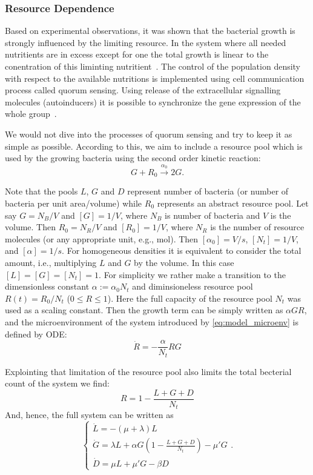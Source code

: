 \documentclass[10pt,A4paper]{article}
\begin{document}
\subsubsection{Resource Dependence}

Based on experimental observations, it was shown that the bacterial growth is strongly influenced by the limiting resource.
In the system where all needed nutritients are in excess except for one the total growth is linear to the conentration of this liminting nutritient~\cite{hibbing_bacterial_2010, monod_growth_1949}.
The control of the population density with respect to the available nutritions is implemented using cell communication process called quorum sensing. 
Using release of the extracellular signalling molecules (autoinducers) it is possible to synchronize the gene expression of the whole group~\cite{ng_bacterial_2009}.

We would not dive into the processes of quorum sensing and try to keep it as simple as possible.
According to this, we aim to include a resource pool which is used by the growing bacteria using the second order kinetic reaction:
\begin{equation}
    G + R_0  \stackrel{\alpha_0}{\longrightarrow} 2G.
\end{equation}

Note that the pools $L$, $G$ and $D$ represent number of bacteria (or number of bacteria per unit area/volume) while $R_0$ represents an abstract resource pool. 
Let say $G=N_B/V$ and $[G]=1/V$, where $N_B$ is number of bacteria and $V$ is the volume. 
Then $R_0=N_R/V$ and $[R_0]=1/V$, where $N_R$ is the number of resource molecules (or any appropriate unit, e.g., mol). 
Then $[\alpha_0]=V/s$, $[N_t]=1/V$, and $[\alpha]=1/s$. 
For homogeneous densities it is equivalent to consider the total amount, i.e., multiplying $L$ and $G$ by the volume. 
In this case $[L]=[G]=[N_t]=1$.
For simplicity we rather make a transition to the dimensionless constant $\alpha:=\alpha_0 N_t$ and diminsioneless resource pool $R(t) = R_0 / N_t$ ($0 \leqslant R \leqslant 1$).
Here the full capacity of the resource pool $N_t$ was used as a scaling constant.
Then the growth term can be simply written as $\alpha G R$, and the microenvironment of the system introduced by \ref{eq:model_microenv} is defined by ODE:
\begin{equation}
\dot{R} = -\frac{\alpha}{N_t} R G
\end{equation}

Explointing that limitation of the resource pool also limits the total becterial count of the system  we find:
\begin{equation}
    R = 1 - \frac{L+G+D}{N_t}
\end{equation}
And, hence, the full system can be written as
\begin{equation}
    \begin{cases}
        \dot{L} = -(\mu + \lambda) L\\
        \dot{G} = \lambda L + \alpha G\left(1-\frac{L+G+D}{N_t}\right)-\mu' G\\
        \dot{D} = \mu  L + \mu' G- \beta D  
    \end{cases}.
\end{equation}
\end{document}
